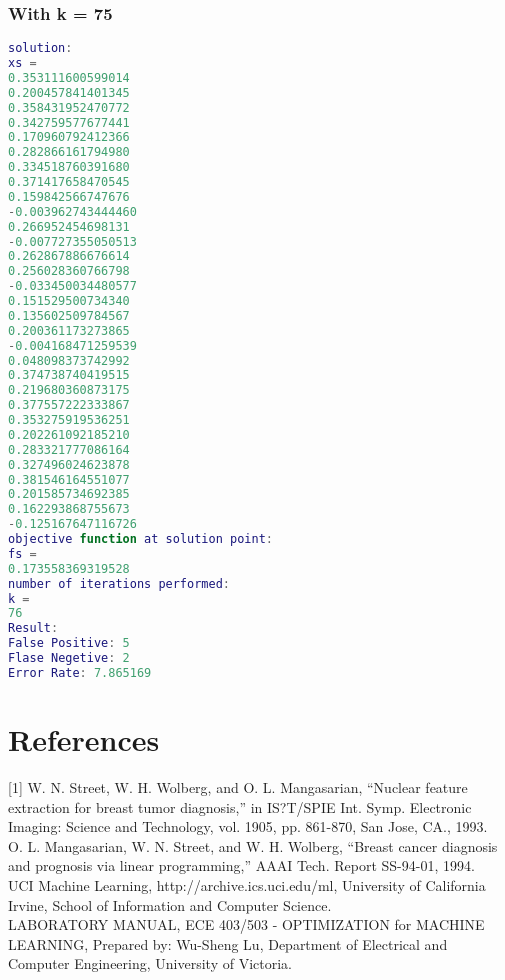 \subsubsection{With k = 75}
\label{subsubsect:75_iterations}
\begin{lstlisting}[language=Matlab]
solution:
xs =
0.353111600599014
0.200457841401345
0.358431952470772
0.342759577677441
0.170960792412366
0.282866161794980
0.334518760391680
0.371417658470545
0.159842566747676
-0.003962743444460
0.266952454698131
-0.007727355050513
0.262867886676614
0.256028360766798
-0.033450034480577
0.151529500734340
0.135602509784567
0.200361173273865
-0.004168471259539
0.048098373742992
0.374738740419515
0.219680360873175
0.377557222333867
0.353275919536251
0.202261092185210
0.283321777086164
0.327496024623878
0.381546164551077
0.201585734692385
0.162293868755673
-0.125167647116726
objective function at solution point:
fs =
0.173558369319528
number of iterations performed:
k =
76
Result:
False Positive: 5
Flase Negetive: 2
Error Rate: 7.865169
\end{lstlisting}

\section{References}
[1] W. N. Street, W. H. Wolberg, and O. L. Mangasarian, “Nuclear feature extraction for breast tumor
diagnosis,” in IS?T/SPIE Int. Symp. Electronic Imaging: Science and Technology, vol. 1905, pp. 861-870, San
Jose, CA., 1993. \\\relax
[2] O. L. Mangasarian, W. N. Street, and W. H. Wolberg, “Breast cancer diagnosis and prognosis via
linear programming,” AAAI Tech. Report SS-94-01, 1994. \\\relax
[3] UCI Machine Learning, http://archive.ics.uci.edu/ml, University of California Irvine, School of
Information and Computer Science. \\\relax
[4] LABORATORY MANUAL, ECE 403/503 - OPTIMIZATION for MACHINE LEARNING, Prepared by: Wu-Sheng Lu, Department of Electrical and Computer Engineering, University of Victoria.